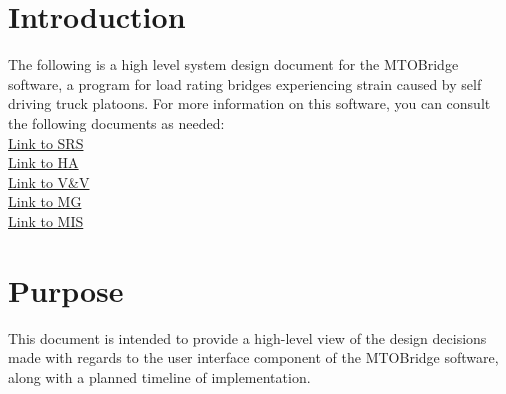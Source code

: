 \documentclass[12pt, titlepage]{article}
\begin{document}
\tableofcontents

\newpage

\listoftables

\listoffigures

\newpage


\section{Introduction}
The following is a high level system design document for the MTOBridge software, a program for load rating bridges experiencing strain caused by self driving truck platoons. For more information on this software, you can consult the following documents as needed:\\
\href{../../SRS/SRS.pdf}{Link to SRS}\\
\href{../../HazardAnalysis/HazardAnalysis.pdf}{Link to HA}\\
\href{../../VnVPlan/VnVPlan.pdf}{Link to V\&V}\\
\href{../../Design/SoftArchitecture/MG.pdf}{Link to MG}\\
\href{../../Design/SystDesign/SystDes.pdf}{Link to MIS}\\
\section{Purpose}
This document is intended to provide a high-level view of the design decisions made with regards to the user interface component of the MTOBridge software, along with a planned timeline of implementation.
\end{document}
